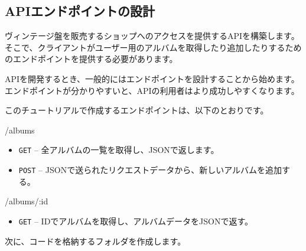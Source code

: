 \subsection{APIエンドポイントの設計}

ヴィンテージ盤を販売するショップへのアクセスを提供するAPIを構築します。そこで、クライアントがユーザー用のアルバムを取得したり追加したりするためのエンドポイントを提供する必要があります。

APIを開発するとき、一般的にはエンドポイントを設計することから始めます。エンドポイントが分かりやすいと、APIの利用者はより成功しやすくなります。

このチュートリアルで作成するエンドポイントは、以下のとおりです。

/albums

\begin{itemize}
\item
  \texttt{GET} -- 全アルバムの一覧を取得し、JSONで返します。
\item
  \texttt{POST} --
  JSONで送られたリクエストデータから、新しいアルバムを追加する。
\end{itemize}

/albums/:id

\begin{itemize}
\item
  \texttt{GET} -- IDでアルバムを取得し、アルバムデータをJSONで返す。
\end{itemize}

次に、コードを格納するフォルダを作成します。


